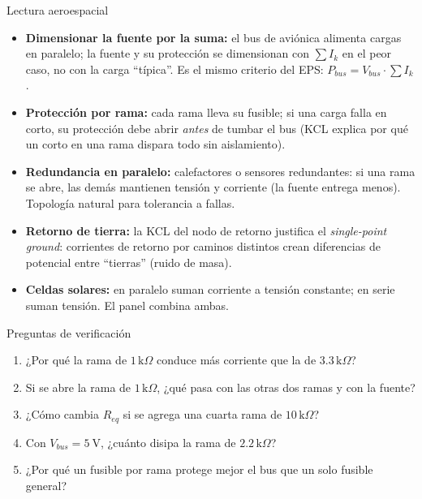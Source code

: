 \documentclass[aspectratio=169]{beamer}
\begin{document}
\begin{frame}{Lectura aeroespacial}
  \begin{itemize}
    \item \textbf{Dimensionar la fuente por la suma:} el bus de aviónica alimenta
      cargas en paralelo; la fuente y su protección se dimensionan con $\sum I_k$
      en el peor caso, no con la carga ``típica''. Es el mismo criterio del EPS:
      $P_{bus} = V_{bus}\cdot\sum I_k$.
    \item \textbf{Protección por rama:} cada rama lleva su fusible; si una carga
      falla en corto, su protección debe abrir \emph{antes} de tumbar el bus
      (KCL explica por qué un corto en una rama dispara todo sin aislamiento).
    \item \textbf{Redundancia en paralelo:} calefactores o sensores redundantes:
      si una rama se abre, las demás mantienen tensión y corriente (la fuente
      entrega menos). Topología natural para tolerancia a fallas.
    \item \textbf{Retorno de tierra:} la KCL del nodo de retorno justifica el
      \emph{single-point ground}: corrientes de retorno por caminos distintos
      crean diferencias de potencial entre ``tierras'' (ruido de masa).
    \item \textbf{Celdas solares:} en paralelo suman corriente a tensión
      constante; en serie suman tensión. El panel combina ambas.
  \end{itemize}
\end{frame}

\begin{frame}{Preguntas de verificación}
  \begin{enumerate}
    \item ¿Por qué la rama de $1\,\text{k}\Omega$ conduce más corriente que la de $3.3\,\text{k}\Omega$?
    \item Si se abre la rama de $1\,\text{k}\Omega$, ¿qué pasa con las otras dos ramas y con la fuente?
    \item ¿Cómo cambia $R_{eq}$ si se agrega una cuarta rama de $10\,\text{k}\Omega$?
    \item Con $V_{bus} = \SI{5}{\volt}$, ¿cuánto disipa la rama de $2.2\,\text{k}\Omega$?
    \item ¿Por qué un fusible por rama protege mejor el bus que un solo fusible general?
  \end{enumerate}
\end{frame}
\end{document}
